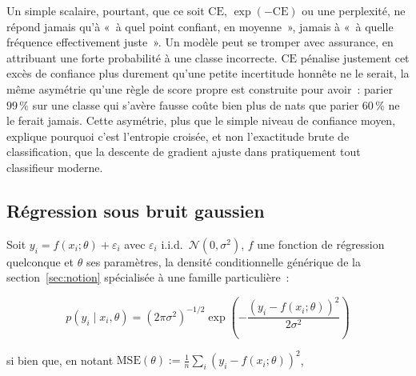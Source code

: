 \documentclass[11pt]{article}
\begin{document}
Un simple scalaire, pourtant, que ce soit $\mathrm{CE}$,
$\exp(-\mathrm{CE})$ ou une perplexité, ne répond jamais qu'à «~à quel
point confiant, en moyenne~», jamais à «~à quelle fréquence
effectivement juste~». Un modèle peut se tromper avec assurance, en
attribuant une forte probabilité à une classe incorrecte. $\mathrm{CE}$
pénalise justement cet excès de confiance plus durement qu'une petite
incertitude honnête ne le serait, la même asymétrie qu'une règle de
score propre est construite pour avoir~: parier $99\,\%$ sur une classe
qui s'avère fausse coûte bien plus de nats que parier $60\,\%$ ne le
ferait jamais. Cette asymétrie, plus que le simple niveau de confiance
moyen, explique pourquoi c'est l'entropie croisée, et non l'exactitude
brute de classification, que la descente de gradient ajuste dans
pratiquement tout classifieur moderne.

\subsection{Régression sous bruit gaussien}
\label{sec:regression}

Soit $y_i = f(x_i;\theta) + \varepsilon_i$ avec $\varepsilon_i$ i.i.d.\
$\mathcal N(0,\sigma^2)$, $f$ une fonction de régression quelconque et
$\theta$ ses paramètres, la densité conditionnelle générique de la
section~\ref{sec:notion} spécialisée à une famille particulière~:

\begin{center}
\end{center}

\begin{equation}
p(y_i \mid x_i, \theta) = (2\pi\sigma^2)^{-1/2}
\exp\!\left(-\frac{(y_i - f(x_i;\theta))^2}{2\sigma^2}\right)
\end{equation}

si bien que, en notant $\mathrm{MSE}(\theta) := \frac1n\sum_i (y_i -
f(x_i;\theta))^2$,
\end{document}
